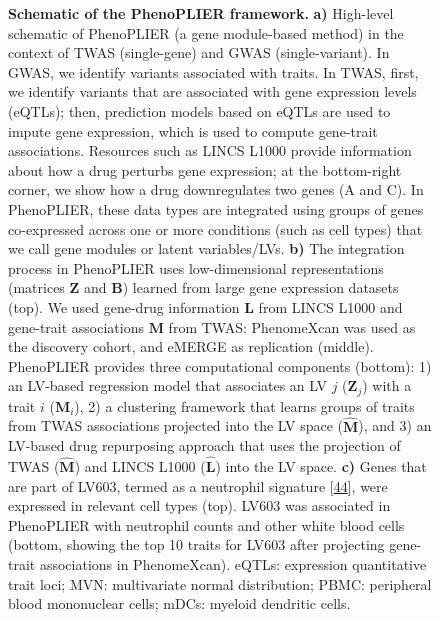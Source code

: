 \documentclass[
  legalpaperpaper,
]{article}
\begin{document}
\begin{figure}
\hypertarget{fig:entire_process}{%
\centering

\caption{\textbf{Schematic of the PhenoPLIER framework.}
\textbf{a)} High-level schematic of PhenoPLIER (a gene module-based method) in the context of TWAS (single-gene) and GWAS (single-variant).
In GWAS, we identify variants associated with traits.
In TWAS, first, we identify variants that are associated with gene expression levels (eQTLs); then, prediction models based on eQTLs are used to impute gene expression, which is used to compute gene-trait associations.
Resources such as LINCS L1000 provide information about how a drug perturbs gene expression; at the bottom-right corner, we show how a drug downregulates two genes (A and C).
In PhenoPLIER, these data types are integrated using groups of genes co-expressed across one or more conditions (such as cell types) that we call gene modules or latent variables/LVs.
\textbf{b)} The integration process in PhenoPLIER uses low-dimensional representations (matrices \(\mathbf{Z}\) and \(\mathbf{B}\)) learned from large gene expression datasets (top).
We used gene-drug information \(\mathbf{L}\) from LINCS L1000 and gene-trait associations \(\mathbf{M}\) from TWAS: PhenomeXcan was used as the discovery cohort, and eMERGE as replication (middle).
PhenoPLIER provides three computational components (bottom):
1) an LV-based regression model that associates an LV \(j\) (\(\mathbf{Z}_j\)) with a trait \(i\) (\(\mathbf{M}_i\)),
2) a clustering framework that learns groups of traits from TWAS associations projected into the LV space (\(\hat{\mathbf{M}}\)),
and 3) an LV-based drug repurposing approach that uses the projection of TWAS (\(\hat{\mathbf{M}}\)) and LINCS L1000 (\(\hat{\mathbf{L}}\)) into the LV space.
\textbf{c)} Genes that are part of LV603, termed as a neutrophil signature {[}\protect\hyperlink{ref-14rnBunuZ}{44}{]}, were expressed in relevant cell types (top).
LV603 was associated in PhenoPLIER with neutrophil counts and other white blood cells (bottom, showing the top 10 traits for LV603 after projecting gene-trait associations in PhenomeXcan).
eQTLs: expression quantitative trait loci;
MVN: multivariate normal distribution;
PBMC: peripheral blood mononuclear cells;
mDCs: myeloid dendritic cells.}\label{fig:entire_process}
}
\end{figure}
\end{document}
